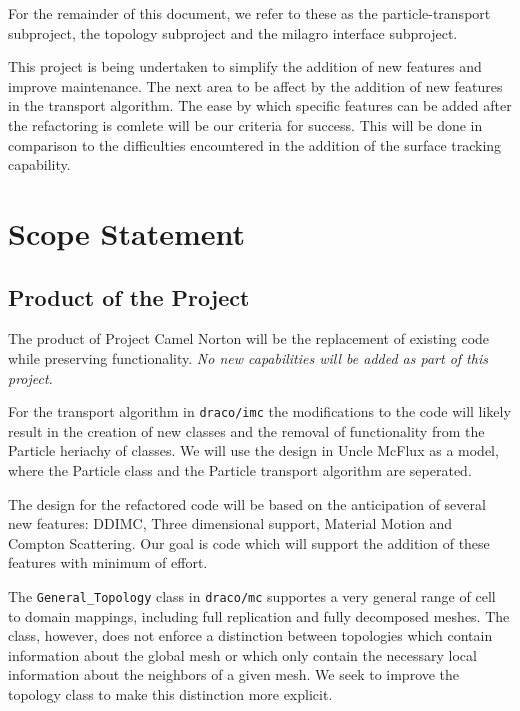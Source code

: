 \documentclass[11pt]{nmemo}
\begin{document}
For the remainder of this document, we refer to these as the
particle-transport subproject, the topology subproject and the milagro
interface subproject.

This project is being undertaken to simplify the addition of new
features and improve maintenance. The next area to be affect by the
addition of new features in the transport algorithm. The ease by which
specific features can be added after the refactoring is comlete will
be our criteria for success. This will be done in comparison to the
difficulties encountered in the addition of the surface tracking
capability.

\newpage
\section*{Scope Statement}


\subsection*{Product of the Project}

The product of Project Camel Norton will be the replacement of
existing code while preserving functionality. {\em No new capabilities
  will be added as part of this project.}

For the transport algorithm in {\tt draco/imc} the modifications to
the code will likely result in the creation of new classes and the
removal of functionality from the Particle heriachy of classes. We
will use the design in Uncle McFlux as a model, where the Particle
class and the Particle transport algorithm are seperated.

The design for the refactored code will be based on the anticipation
of several new features: DDIMC, Three dimensional support, Material
Motion and Compton Scattering. Our goal is code which will support the
addition of these features with minimum of effort.

The {\tt General\_Topology} class in {\tt draco/mc} supportes a very
general range of cell to domain mappings, including full replication
and fully decomposed meshes. The class, however, does not enforce a
distinction between topologies which contain information about the
global mesh or which only contain the necessary local information
about the neighbors of a given mesh. We seek to improve the topology
class to make this distinction more explicit.
\end{document}
